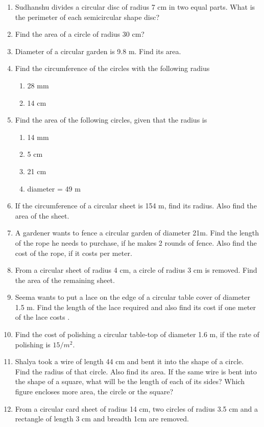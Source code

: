 \begin{enumerate}[label=\thesection.\arabic*, ref=\thesection.\theenumi]
\item Sudhanshu divides a circular disc of radius 7 cm in two equal parts. What is the perimeter of each semicircular shape disc?
\item Find the area of a circle of radius 30 cm?
\item Diameter of a circular garden is 9.8 m. Find its area.
\item Find the circumference of the circles with the following radius  
	\begin{enumerate}
		\item 28 mm
\item  14 cm
\end{enumerate}
\item  Find the area of the following circles, given that the radius is
	\begin{enumerate}
\item 14 mm 
\item 5 cm
\item 21 cm 
\item  diameter = 49 m
\end{enumerate}
\item If the circumference of a circular sheet is 154 m, find its radius. Also find the area of the sheet. 
\item A gardener wants to fence a circular garden of diameter 21m. Find the length of the rope he needs to purchase, if he makes 2 rounds of fence. Also find the cost of the rope, if it costs  per meter. 
\item  From a circular sheet of radius 4 cm, a circle of radius 3 cm is removed. Find the area of the remaining sheet. 
\item Seema wants to put a lace on the edge of a circular table cover of diameter 1.5 m. Find the length of the lace required and also find its cost if one meter of the lace costs
. 
\item Find the cost of polishing a circular table-top of diameter 1.6 m, if the rate of polishing is \rupee $15/m^2$. 
\item Shalya took a wire of length 44 cm and bent it into the shape of a circle. Find the radius of that circle. Also find its area. If the same wire is bent into the shape of a square, what will be the length of each of its sides? Which figure encloses more
area, the circle or the square? 
\item From a circular card sheet of radius 14 cm, two circles of radius 3.5 cm and a rectangle of length 3 cm and breadth 1cm are removed. 

\end{enumerate}
